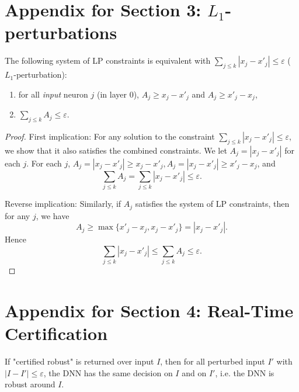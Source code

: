 

\section{Appendix for Section 3: $L_1$-perturbations}

\label{app.L1}

\setcounter{proposition}{1}



\begin{proposition}
	The following system of LP constraints is equivalent with $\sum_{j\leq k} |x_j-x'_j| \leq \varepsilon$ ($L_1$-perturbation):
	
	\begin{enumerate}
		\item for all {\em input} neuron $j$ (in layer 0), 
		$A_j \geq x_j - x'_j $ and $A_j \geq x'_j - x_j$,
		
		\item $\sum_{j\leq k} A_j \leq \varepsilon$.
	\end{enumerate}
\end{proposition}


\begin{proof}[Proof] First implication: For any solution to the constraint $\sum_{j\leq k} |x_j-x'_j| \leq \varepsilon$, we show that it also satisfies the combined constraints. 
	We let $A_j = |x_j-x'_j|$ for each $j$. For each $j$, $A_j = |x_j-x'_j|\geq x_j - x'_j, A_j = |x_j-x'_j|\geq x'_j - x_j$,  and $$\sum_{j\leq k} A_j = \sum_{j\leq k} |x_j-x'_j| \leq\varepsilon.$$
	
	
Reverse implication: Similarly, if $A_j$ satisfies the system of LP constraints, then for any $j$, we have $$A_j \geq \max\{x'_j - x_j, x_j - x'_j\} = |x_j-x'_j|.$$ Hence $$\sum_{j\leq k} |x_j-x'_j| \leq \sum_{j\leq k} A_j\leq\varepsilon.$$
\end{proof}



\section{Appendix for Section 4: Real-Time Certification}

\label{app.realtime}

\begin{proposition}
If "certified robust" is returned over input $I$, 
then for all perturbed input $I'$ with  $|I - I'| \leq \varepsilon$,
the DNN has the same decision on $I$ and on $I'$, i.e. the DNN is robust around $I$. %
\end{proposition}

